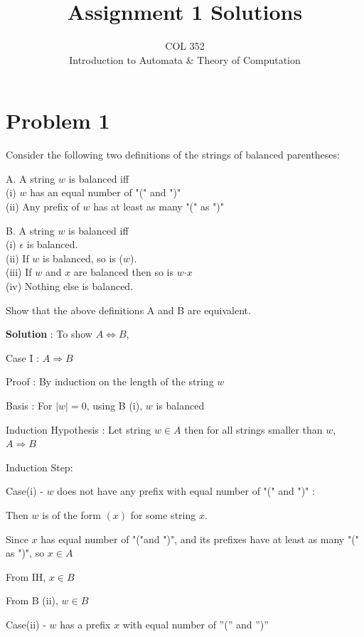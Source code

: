 \documentclass{article}
\title{Assignment 1 Solutions}
\author{COL 352\\
    Introduction to Automata \& 
    Theory of Computation}
\date{}
\begin{document}
    \maketitle
    
    \section*{Problem 1} Consider the following two definitions of the strings of balanced parentheses:
    
    A. A string $w$ is balanced iff \\
    (i) $w$ has an equal number of "(" and ")"\\
    (ii) Any prefix of $w$ has at least as many "(" as ")"
    
    B. A string $w$ is balanced iff\\
    (i) $\epsilon $ is balanced.\\
    (ii) If $w$ is balanced, so is ($w$).\\
    (iii) If $w$ and $x$ are balanced then so is $w\textrm{·}x$\\
    (iv) Nothing else is balanced.
    
    Show that the above definitions A and B are equivalent.
    
    
    \textbf{Solution} : To show $A \iff B$,
    
    Case I : $A \Longrightarrow B$
    
    Proof : By induction on the length of the string $w$
    
    Basis : For $|w| = 0$, using B (i), $w$ is balanced
    
    Induction Hypothesis : Let string $w \in A$ then for all strings smaller than $w$, $A \Longrightarrow B$
    
    Induction Step:
    
    \quad Case(i) - $w$ does not have any prefix with equal number of "(" and ")" : 
    
    \qquad Then $w$ is of the form $( x )$ for some string $x$. 
    
    \qquad Since $x$ has equal number of "("and ")", and its prefixes have at least as many "(" as ")", so $x \in A$
    
    \qquad From IH,  $x \in B$
    
    \qquad From B (ii),  $w \in B$
    
    
    
    \quad Case(ii) - $w$ has a prefix $x$ with equal number of ”(” and ”)”
    
\end{document}
